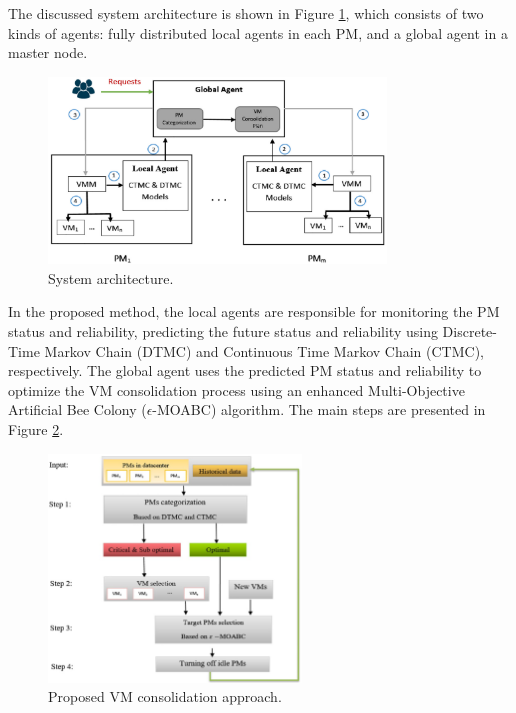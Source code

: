 \documentclass[UTF8, fontset=windows]{article}
\begin{document}
The discussed system architecture is shown in Figure \ref{fig:architecture}, which consists of two kinds of agents: fully distributed local agents in each PM, and a global agent in a master node. 

\begin{figure}[h]
  \centering
  \includegraphics[width=0.8\textwidth]{images/architecture.png}
  \caption{System architecture.}
  \label{fig:architecture}
\end{figure}

In the proposed method, the local agents are responsible for monitoring the PM status and reliability, predicting the future status and reliability using Discrete-Time Markov Chain (DTMC) and Continuous Time Markov Chain (CTMC), respectively. The global agent uses the predicted PM status and reliability to optimize the VM consolidation process using an enhanced Multi-Objective Artificial Bee Colony ($\epsilon$-MOABC) algorithm. The main steps are presented in Figure \ref{fig:method}.

\begin{figure}[h]
  \centering
  \includegraphics[width=0.6\textwidth]{images/method.png}
  \caption{Proposed VM consolidation approach.}
  \label{fig:method}
\end{figure}
\end{document}

